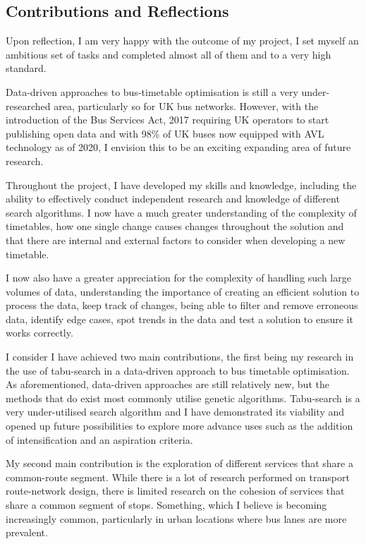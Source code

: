 \documentclass{article}
\begin{document}
\subsection{Contributions and Reflections}
Upon reflection, I am very happy with the outcome of my project, I set myself an ambitious set of tasks and completed almost all of them and to a very high standard. 

\par
Data-driven approaches to bus-timetable optimisation is still a very under-researched area, particularly so for UK bus networks. However, with the introduction of the Bus Services Act, 2017 \cite{RN13} requiring UK operators to start publishing open data and with 98\% of UK buses now equipped with AVL technology as of 2020\cite{RN12}, I envision this to be an exciting expanding area of future research. 

\par 
Throughout the project, I have developed my skills and knowledge, including the ability to effectively conduct independent research and knowledge of different search algorithms. I now have a much greater understanding of the complexity of timetables, how one single change causes changes throughout the solution and that there are internal and external factors to consider when developing a new timetable.


\par
I now also have a greater appreciation for the complexity of handling such large volumes of data, understanding the importance of creating an efficient solution to process the data, keep track of changes, being able to filter and remove erroneous data, identify edge cases, spot trends in the data and test a solution to ensure it works correctly.


\par 
I consider I have achieved two main contributions, the first being my research in the use of tabu-search in a data-driven approach to bus timetable optimisation. As aforementioned, data-driven approaches are still relatively new, but the methods that do exist most commonly utilise genetic algorithms. Tabu-search is a very under-utilised search algorithm and I have demonstrated its viability and opened up future possibilities to explore more advance uses such as the addition of intensification and an aspiration criteria. 

\par
My second main contribution is the exploration of different services that share a common-route segment. While there is a lot of research performed on transport route-network design, there is limited research on the cohesion of services that share a common segment of stops. Something, which I believe is becoming increasingly common, particularly in urban locations where bus lanes are more prevalent. 
\end{document}
